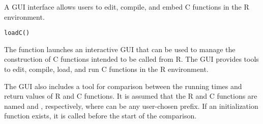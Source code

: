 \documentclass[letterpaper]{book}
\begin{document}
\begin{Description}\relax
A GUI interface allows users to edit, compile, and embed C functions
in the R environment.
\end{Description}
\begin{Usage}
\begin{verbatim}loadC()\end{verbatim}
\end{Usage}
\begin{Details}\relax
The function  launches an interactive GUI that can be used
to manage the construction of C functions intended to be called from R. The
GUI provides tools to edit, compile, load, and run C functions in the R
environment.

The  GUI also includes a tool for comparison between the running times
and return values of R and C functions. It is assumed that the R and C
functions are named  and , respectively, where 
 can be any user-chosen prefix. If an initialization function 
 exists, it is called before the start of the comparison.


\end{Details}
\end{document}
